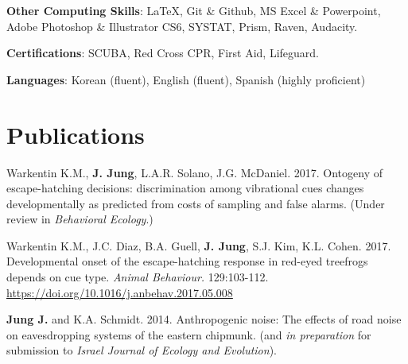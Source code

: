 \documentclass[margin,line]{res}
\begin{document}
\begin{resume}
{\bf Other Computing Skills}: \LaTeX, Git \& Github, MS Excel \& Powerpoint, Adobe Photoshop \& Illustrator CS6, SYSTAT, Prism, Raven, Audacity. 
\vspace*{-3mm}

{\bf Certifications}: SCUBA, Red Cross CPR, First Aid, Lifeguard. 
\vspace*{-3mm}

{\bf Languages}: Korean (fluent), English (fluent), Spanish (highly proficient)

% 

\section{\sc Publications}

Warkentin K.M., {\bf J. Jung}, L.A.R. Solano, J.G. McDaniel. 2017. {Ontogeny of escape-hatching decisions: discrimination among vibrational cues changes developmentally as predicted from costs of sampling and false alarms.} (Under review in {\it Behavioral Ecology}.) 

\vspace{-.3cm}
Warkentin K.M., J.C. Diaz, B.A. Guell, {\bf J. Jung}, S.J. Kim, K.L. Cohen. 2017. {Developmental onset of the escape-hatching response in red-eyed treefrogs depends on cue type.} {\it Animal Behaviour.} {129:103-112.} \href{http://www.sciencedirect.com/science/article/pii/S0003347217301458}{\ttfamily https://doi.org/10.1016/j.anbehav.2017.05.008}

\vspace{-.3cm}
{\bf Jung J.} and K.A. Schmidt. 2014. {Anthropogenic noise: The effects of road noise on eavesdropping systems of the eastern chipmunk.} \href{http://www.caryinstitute.org/sites/default/files/public/reprints/jung_2014_REU.pdf}{} (and {\it in preparation} for submission to {\it Israel Journal of Ecology and Evolution}).
  



\end{resume}
\end{document}
